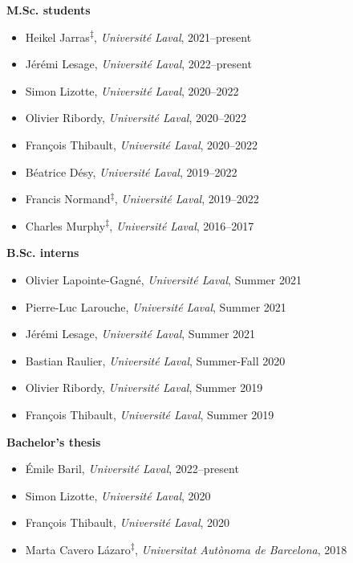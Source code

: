 \documentclass[11pt]{article}
\begin{document}
%
%
%
\textbf{M.Sc. students}
%
\begin{itemize}
  \item Heikel Jarras\textsuperscript{$\ddagger$}, \textit{Universit\'e Laval}, 2021--present
  \item Jérémi Lesage, \textit{Universit\'e Laval}, 2022--present
  \item Simon Lizotte, \textit{Universit\'e Laval}, 2020--2022
  \item Olivier Ribordy, \textit{Universit\'e Laval}, 2020--2022
  \item Fran\c{c}ois Thibault, \textit{Universit\'e Laval}, 2020--2022
  \item B\'eatrice D\'esy, \textit{Universit\'e Laval}, 2019--2022
  \item Francis Normand\textsuperscript{$\ddagger$}, \textit{Universit\'e Laval}, 2019--2022 \href{http://hdl.handle.net/20.500.11794/73573}{}
  \item Charles Murphy\textsuperscript{$\ddagger$}, \textit{Universit\'e Laval}, 2016--2017 \href{http://hdl.handle.net/20.500.11794/30382}{}
\end{itemize}
%
%
%
\textbf{B.Sc. interns}
%
\begin{itemize}
  \item Olivier Lapointe-Gagn\'e, \textit{Universit\'e Laval}, Summer 2021
  \item Pierre-Luc Larouche, \textit{Universit\'e Laval}, Summer 2021
  \item Jérémi Lesage, \textit{Universit\'e Laval}, Summer 2021
  \item Bastian Raulier, \textit{Universit\'e Laval}, Summer-Fall 2020
  \item Olivier Ribordy, \textit{Universit\'e Laval}, Summer 2019
  \item Fran\c{c}ois Thibault, \textit{Universit\'e Laval}, Summer 2019
\end{itemize}
%
%
%
\textbf{Bachelor's thesis}
%
\begin{itemize}
  \item Émile Baril, \textit{Universit\'e Laval}, 2022--present
  \item Simon Lizotte, \textit{Universit\'e Laval}, 2020
  \item Fran\c{c}ois Thibault, \textit{Universit\'e Laval}, 2020
  \item Marta Cavero L\'azaro\textsuperscript{$\ddagger$}, \textit{Universitat Aut\`onoma de Barcelona}, 2018
\end{itemize} \vspace{0.75\baselineskip}
\end{document}
